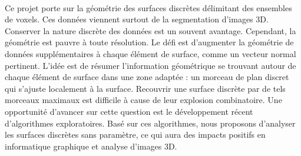\documentclass[french]{article}
\begin{document}
~

Ce projet porte sur la géométrie des surfaces discrètes délimitant des ensembles de voxels. Ces données viennent surtout de la segmentation d'images 3D. Conserver la nature discrète des données est un souvent avantage. Cependant, la géométrie est pauvre à toute résolution. Le défi est d'augmenter la géométrie de données supplémentaires à chaque élément de surface, comme un vecteur normal pertinent.
L'idée est de résumer l'information géométrique se trouvant autour de chaque élément de surface dans une zone adaptée : un morceau de plan discret qui s'ajuste localement à la surface. Recouvrir une surface discrète par de tels morceaux maximaux est difficile à cause de leur explosion combinatoire. Une opportunité d'avancer sur cette question est le développement récent d'algorithmes exploratoires. Basé sur ces algorithmes, nous proposons d'analyser les surfaces discrètes sans paramètre, ce qui aura des impacts positifs en informatique graphique et analyse d'images 3D.
  
\end{document}
